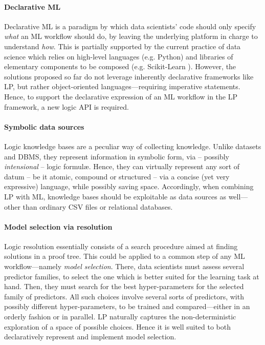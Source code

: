 \documentclass[runningheads]{llncs}
\begin{document}
\paragraph{Declarative ML} Declarative ML is a paradigm by which data scientists' code should only specify \emph{what} an ML workflow should do, by leaving the underlying platform in charge to understand \emph{how}.
%
This is partially supported by the current practice of data science which relies on high-level languages (e.g. Python) and libraries of elementary components to be composed (e.g. Scikit-Learn \cite{scikit-learn}).
%
However, the solutions proposed so far do not leverage inherently declarative frameworks like LP, but rather object-oriented languages---requiring imperative statements.
%
Hence, to support the declarative expression of an ML workflow in the LP framework, a new logic API is required.
%

\paragraph{Symbolic data sources}
%
Logic knowledge bases are a peculiar way of collecting knowledge.
%
Unlike datasets and DBMS, they represent information in symbolic form, via -- possibly \emph{intensional} -- logic formul\ae{}.
%
Hence, they can virtually represent any sort of datum -- be it atomic, compound or structured -- via a concise (yet very expressive) language, while possibly saving space.
%
Accordingly, when combining LP with ML, knowledge bases should be exploitable as data sources as well---other than ordinary CSV files or relational databases.

\paragraph{Model selection via resolution}
%
Logic resolution essentially consists of a search procedure aimed at finding solutions in a proof tree.
%
This could be applied to a common step of any ML workflow---namely \emph{model selection}.
%
There, data scientists must assess several predictor families, to select the one which is better suited for the learning task at hand.
%
Then, they must search for the best hyper-parameters for the selected family of predictors.
%
All such choices involve several sorts of predictors, with possibly different hyper-parameters, to be trained and compared---either in an orderly fashion or in parallel.
%
LP naturally captures the non-deterministic exploration of a space of possible choices.
%
Hence it is well suited to both declaratively represent and implement model selection.
\end{document}
